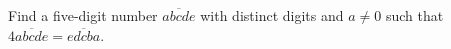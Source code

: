 Find a five-digit number $\overline{abcde}$ with distinct digits and $a\ne0$ such that $4\overline{abcde}=\overline{edcba}$.

